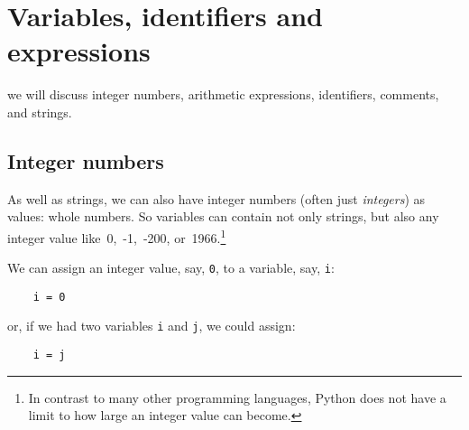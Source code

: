 \section{Variables, identifiers and expressions}

we will discuss integer numbers, arithmetic expressions, 
identifiers, comments, and strings.

\subsection{Integer numbers}

As well as strings, we can also have integer numbers (often just
\emph{integers}) as values: whole numbers.
So variables can contain not only strings, but also any
integer value like~0,~-1,~-200, or~1966.\footnote{In contrast to many
  other programming languages, Python does not have a limit to how
  large an integer value can become.}



We can assign an integer value, say, \verb!0!,
to a variable, say, \verb!i!:

\begin{Verbatim}
    i = 0
\end{Verbatim}



or, if we had two variables \verb!i! and \verb!j!, we could assign:

\begin{Verbatim}
    i = j
\end{Verbatim}

